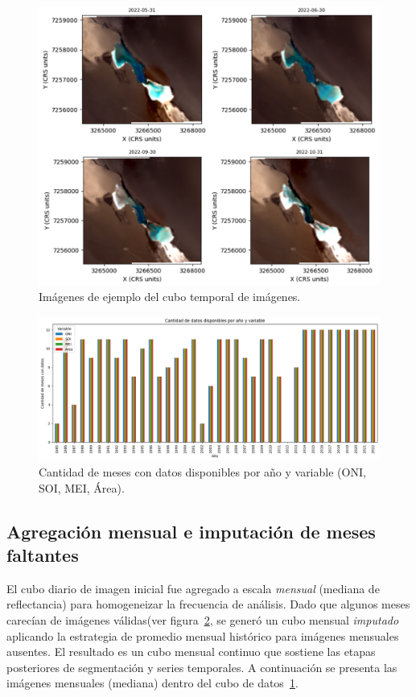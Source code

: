 \begin{figure}[ht]
        \centering
        \includegraphics[scale=.25]
        {Figures/agg_mens.png}
        \caption{Imágenes de ejemplo del cubo temporal de imágenes.}
        \label{fig:agg_mens}
\end{figure}

\begin{figure}[htpb]
    \centering
    \includegraphics[scale=.40]{Figures/conteo_series.png}
    \caption{Cantidad de meses con datos disponibles por año y variable (ONI, SOI, MEI, Área).}
    \label{fig:conteo_datos}
\end{figure}

\subsection{Agregación mensual e imputación de meses faltantes}
El cubo diario de imagen inicial fue agregado a escala \emph{mensual} (mediana de reflectancia) para homogeneizar la frecuencia de análisis. Dado que algunos meses carecían de imágenes válidas(ver figura~\ref{fig:conteo_datos}, se generó un cubo mensual \emph{imputado} aplicando la estrategia de promedio mensual histórico para imágenes mensuales ausentes. El resultado es un cubo mensual continuo que sostiene las etapas posteriores de segmentación y series temporales. A continuación se presenta las imágenes mensuales (mediana) dentro del cubo de datos~\ref{fig:agg_mens}.

